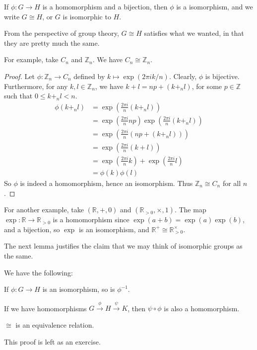 \documentclass[12pt]{article}
\begin{document}
\begin{definition}
    If $\phi : G \to H$ is a homomorphism and a bijection, then $\phi$ is a isomorphism,
    and we write $G \cong H$, or $G$ is isomorphic to $H$.
\end{definition}

From the perspective of group theory, $G \cong H$ satisfies
what we wanted, in that they are pretty much the same.

For example, take $C_n$ and $\mathbb{Z}_n$. We have $C_n \cong \mathbb{Z}_n$.
\begin{proof}
    Let $\phi : \mathbb{Z}_n \to C_n$ defined by $k \mapsto \exp(2\pi ik/n)$.
    Clearly, $\phi$ is bijective. 
    Furthermore, for any $k,l \in \mathbb{Z}_n$, we have
    $k + l = np + (k +_n l)$, for some $p \in \mathbb{Z}$ such that $0 \le k +_n l < n$.
    \begin{align*}
        \phi(k +_n l) 
        &= \exp\left(\frac{2\pi i}{n} (k +_n l)\right)\\
        &= \exp\left(\frac{2\pi i}{n} np\right)\exp\left(\frac{2\pi i}{n} (k +_n l)\right)\\
        &= \exp\left(\frac{2\pi i}{n} (np + (k +_n l))\right)\\
        &= \exp\left(\frac{2\pi i}{n} (k + l)\right)\\
        &= \exp\left(\frac{2\pi i}{n} k\right) + \exp\left(\frac{2\pi i}{n}l\right)\\
        &= \phi(k) \phi(l)
    \end{align*}
    So $\phi$ is indeed a homomorphism,
    hence an isomorphism. Thus $\mathbb{Z}_n \cong C_n$ for all $n$.
\end{proof}

For another example, take $(\mathbb{R},+,0)$ and $(\mathbb{R}_{>0},\times,1)$.
The map $\exp : \mathbb{R} \to \mathbb{R}_{>0}$ 
is a homomorphism since $\exp(a + b) = \exp(a)\exp(b)$,
and a bijection, so $\exp$
is an isomorphism, and $\mathbb{R}^{+} \cong \mathbb{R}^{\times}_{>0}$.

The next lemma justifies the claim that
we may think of isomorphic groups as the same.

\begin{lemma}
    We have the following:
    \begin{compactenum}[(i)]
    \item If $\phi : G \to H$ is an isomorphism, so is $\phi ^{-1}$.
    \item If we have homomorphisms $G \stackrel{\phi}{\to} H \stackrel{\psi}{\to} K$,
        then $\psi\circ\phi$ is also a homomorphism.
    \item $\cong$ is an equivalence relation.
    \end{compactenum}
\end{lemma}
This proof is left as an exercise.
\end{document}
